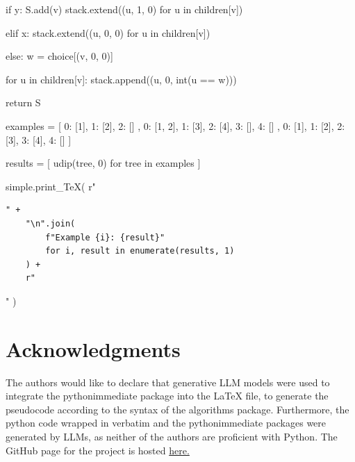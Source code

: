 \documentclass[ a4paper, 11pt]{report}
\theoremstyle{plain}
\theoremstyle{definition}
\begin{document}
\begin{pycode}
        if y:
            S.add(v)
            stack.extend((u, 1, 0) for u in children[v])

        elif x:
            stack.extend((u, 0, 0) for u in children[v])

        else:
            w = choice[(v, 0, 0)]

            for u in children[v]:
                stack.append((u, 0, int(u == w)))

    return S


examples = [
    {
        0: [1],
        1: [2],
        2: []
    },
    {
        0: [1, 2],
        1: [3],
        2: [4],
        3: [],
        4: []
    },
    {
        0: [1],
        1: [2],
        2: [3],
        3: [4],
        4: []
    }
]

results = [
    udip(tree, 0)
    for tree in examples
]

simple.print_TeX(
    r"\begin{verbatim}" +
    "\n".join(
        f"Example {i}: {result}"
        for i, result in enumerate(results, 1)
    ) +
    r"\end{verbatim}"
)
\end{pycode}

\section{Acknowledgments}

The authors would like to declare that generative LLM models were used to integrate the pythonimmediate package into the LaTeX file, to generate the pseudocode according to the syntax of the algorithms package. Furthermore, the python code wrapped in verbatim and the pythonimmediate packages were generated by LLMs, as neither of the authors are proficient with Python. The GitHub page for the project is hosted \href{https://github.com/DerpySnorlax258/DAA-Project}{here.}
\end{document}
